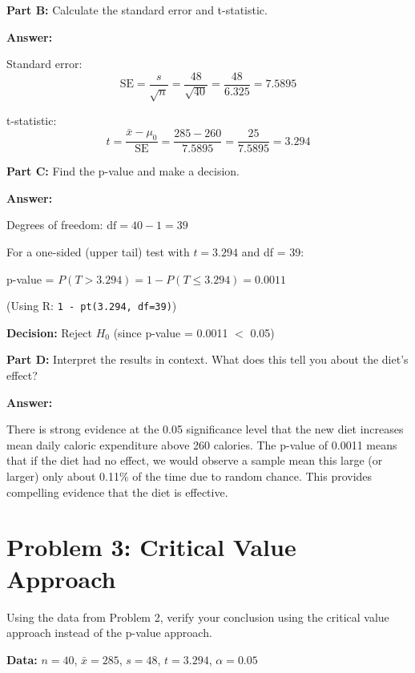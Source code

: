 \documentclass[11pt]{article}
\begin{document}
\vspace{6pt}

\textbf{Part B:} Calculate the standard error and t-statistic.

\textcolor{answergreen}{\textbf{Answer:}}

Standard error:
$$\text{SE} = \frac{s}{\sqrt{n}} = \frac{48}{\sqrt{40}} = \frac{48}{6.325} = 7.5895$$

t-statistic:
$$t = \frac{\bar{x} - \mu_0}{\text{SE}} = \frac{285 - 260}{7.5895} = \frac{25}{7.5895} = 3.294$$

\vspace{6pt}

\textbf{Part C:} Find the p-value and make a decision.

\textcolor{answergreen}{\textbf{Answer:}}

Degrees of freedom: $\text{df} = 40 - 1 = 39$

For a one-sided (upper tail) test with $t = 3.294$ and df = 39:

p-value = $P(T > 3.294) = 1 - P(T \leq 3.294) = 0.0011$

(Using R: \texttt{1 - pt(3.294, df=39)})

\textbf{Decision:} Reject $H_0$ (since p-value = 0.0011 $<$ 0.05)

\vspace{6pt}

\textbf{Part D:} Interpret the results in context. What does this tell you about the diet's effect?

\textcolor{answergreen}{\textbf{Answer:}}

There is strong evidence at the 0.05 significance level that the new diet increases mean daily caloric expenditure above 260 calories. The p-value of 0.0011 means that if the diet had no effect, we would observe a sample mean this large (or larger) only about 0.11\% of the time due to random chance. This provides compelling evidence that the diet is effective.

\newpage

\section{Problem 3: Critical Value Approach}

Using the data from Problem 2, verify your conclusion using the critical value approach instead of the p-value approach.

\textbf{Data:} $n=40$, $\bar{x}=285$, $s=48$, $t=3.294$, $\alpha=0.05$
\end{document}
